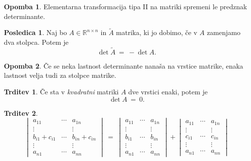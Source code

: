 \documentclass[11pt]{article}
\newcommand{\R}{\mathbb{R}}
\newcommand{\0}{\mathbf{0}}
\theoremstyle{definition}
\theoremstyle{definition}
\newtheorem{trditev}{Trditev}[section]
\theoremstyle{definition}
\theoremstyle{definition}
\newtheorem*{posledica}{Posledica}
\newtheorem*{opomba}{Opomba}
\begin{document}
\begin{opomba}

Elementarna transformacija tipa II na matriki spremeni le predznak determinante.

\end{opomba}
\vspace{0.5cm}

\begin{posledica}

Naj bo $A \in \R^{n \times n}$ in $\tilde{A}$ matrika, ki jo dobimo, če v $A$ zamenjamo dva stolpca. Potem je
$$\det \tilde{A} ~=~ -\det A.$$

\end{posledica}
\vspace{0.5cm}

\begin{opomba}

Če se neka lastnost determinante nanaša na vrstice matrike, enaka lastnost velja tudi za stolpce matrike.

\end{opomba}
\vspace{0.5cm}

\begin{trditev}

Če sta v \textit{kvadratni} matriki $A$ dve vrstici enaki, potem je 
$$\det A ~=~ 0.$$

\end{trditev}
\vspace{0.5cm}

\begin{trditev}

$$\begin{vmatrix}
a_{11} & \cdots & a_{1n} \\
\vdots & ~ & \vdots \\
b_{i1} + c_{i1} & \cdots & b_{in} + c_{in} \\
\vdots & ~ & \vdots \\
a_{n1} & \cdots & a_{nn}
\end{vmatrix} ~=~ \begin{vmatrix}
a_{11} & \cdots & a_{1n} \\
\vdots & ~ & \vdots \\
b_{i1} & \cdots & b_{in} \\
\vdots & ~ & \vdots \\
a_{n1} & \cdots & a_{nn}
\end{vmatrix} + \begin{vmatrix}
a_{11} & \cdots & a_{1n} \\
\vdots & ~ & \vdots \\
c_{i1} & \cdots &  c_{in} \\
\vdots & ~ & \vdots \\
a_{n1} & \cdots & a_{nn}
\end{vmatrix}$$

\end{trditev}
\vspace{0.5cm}
\end{document}
